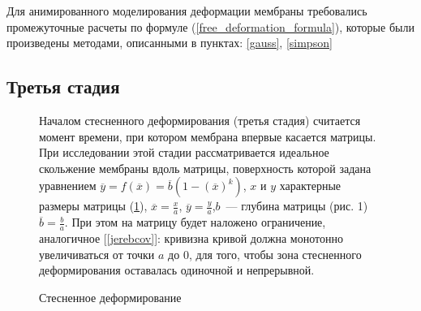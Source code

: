 	
	Для анимированного моделирования деформации мембраны требовались промежуточные
	расчеты по формуле (\ref{free_deformation_formula}), которые были произведены методами, описанными в пунктах: \ref{gauss}, \ref{simpson}
	\newpage
	\subsection{Третья стадия}
	\begin{figure}[h!]
		\begin{minipage}[h]{0.48\linewidth}

				
				\def\svgwidth{\columnwidth}
				\label{quad_matrix_pic}
			\caption{ Стесненное деформирование } 
		\end{minipage}
		\hfill
		\begin{minipage}[h]{0.48\linewidth}	
Началом стесненного деформирования (третья стадия) считается момент времени, при котором мембрана впервые касается матрицы. При исследовании этой стадии рассматривается идеальное скольжение мембраны вдоль матрицы,  поверхность которой задана уравнением $\overline{y} = f(\overline{x}) = \overline{b}(1-(\overline{x})^k)$, $x$ и $y$ характерные размеры матрицы (\ref{quad_matrix_pic}), $\overline{x} = \frac x a$, $\overline{y} = \frac y a$,$b$~--- глубина матрицы (рис. 1) $\overline{b} = \frac b a$. При этом на матрицу будет наложено ограничение, аналогичное 
[\ref{jerebcov}]: кривизна кривой должна монотонно увеличиваться от точки $a$ до $0$, для того, чтобы зона стесненного деформирования оставалась одиночной и непрерывной.
	
		\end{minipage}
		\label{quad_matrix_pic}
	\end{figure}
	
